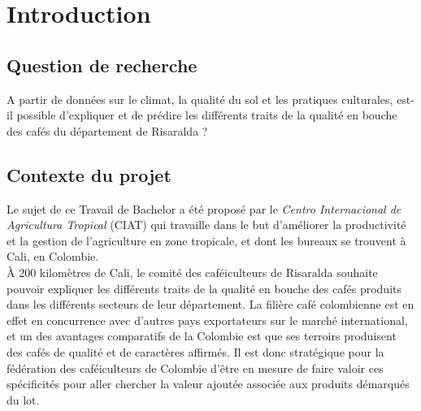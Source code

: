 
\chapter{Introduction}
\section{Question de recherche}



A partir de données sur le climat, la qualité du sol et les pratiques culturales, est-il possible d’expliquer et de prédire les différents traits de la qualité en bouche des cafés du département de Risaralda ?


\section{Contexte du projet}
Le sujet de ce Travail de Bachelor a été proposé par le \textit{Centro Internacional de Agricultura Tropical } (CIAT) qui travaille dans le but d’améliorer la productivité et la gestion de l’agriculture en zone tropicale, et dont les bureaux se trouvent à Cali, en Colombie.\\

\noindent À 200 kilomètres de Cali, le comité des caféiculteurs de Risaralda souhaite pouvoir expliquer les différents traits de la qualité en bouche des cafés produits dans les différents secteurs de leur département. La filière café colombienne est en effet en concurrence avec d’autres pays exportateurs sur le marché international, et un des avantages comparatifs de la Colombie est que ses terroirs produisent des cafés de qualité et de caractères affirmés. Il est donc stratégique pour la fédération des caféiculteurs de Colombie d'être en mesure de faire valoir ces spécificités pour aller chercher la valeur ajoutée associée aux produits démarqués du lot.\\


